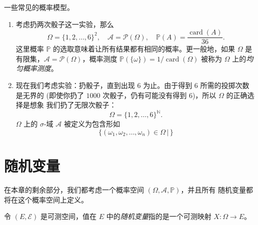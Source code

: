\documentclass[fontset=none]{Notes}
\DeclareMathOperator\card{card}
\begin{document}
\begin{example}
  一些常见的概率模型。
  \begin{enumerate}
    \item 考虑扔两次骰子这一实验，那么
    \[
      \Omega=\{1,2,\dots,6\}^2,\quad \mathcal{A}=\mathcal{P}(\Omega),\quad
      \mathbb{P}(A)=\frac{\card(A)}{36}.
    \]
    这里概率 $\mathbb{P}$ 的选取意味着让所有结果都有相同的概率。更一般地，如果 $\Omega$
    是有限集，$\mathcal{A}=\mathcal{P}(\Omega)$，概率测度 $\mathbb{P}(\{\omega\})=1/\card(\Omega)$
    被称为 $\Omega$ 上的\emph{均匀概率测度}。
    \item 现在我们考虑实验：扔骰子，直到出现 $6$ 为止。由于得到 $6$ 所需的投掷次数是无界的
    (即使你扔了 $1000$ 次骰子，仍有可能没有得到 $6$)，所以 $\Omega$ 的正确选择是想象
    我们扔了无限次骰子：
    \[
      \Omega=\{1,2,\dots,6\}^{\mathbb{N}}.
    \]
    $\Omega$ 上的 $\sigma$-域 $\mathcal{A}$ 被定义为包含形如
    \[
      \{(\omega_1,\omega_2,\dots,\omega_n)\in\Omega\,|\, \}
    \]
  \end{enumerate}
\end{example}

\section{随机变量}

在本章的剩余部分，我们都考虑一个概率空间 $(\Omega,\mathcal{A},\mathbb{P})$，并且所有
随机变量都将在这个概率空间上定义。

\begin{definition}
  令 $(E,\mathcal{E})$ 是可测空间，值在 $E$ 中的\emph{随机变量}指的是一个可测映射
  $X:\Omega\to E$。
\end{definition}
\end{document}
